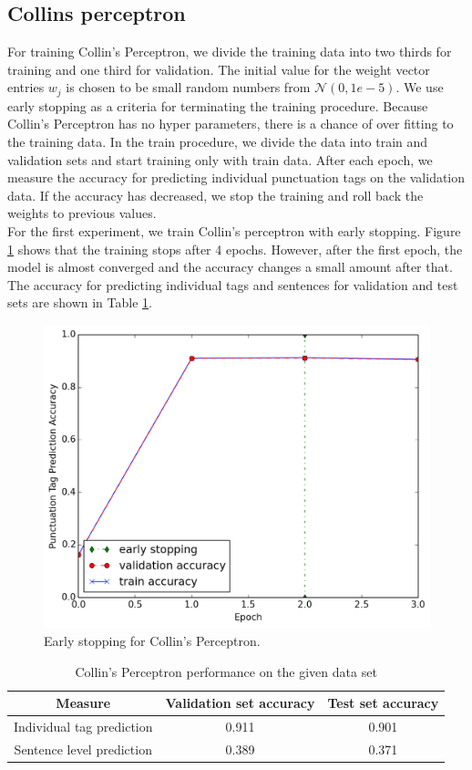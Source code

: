 \documentclass[twoside,12pt]{article}
\begin{document}
\subsection{Collins perceptron}
For training Collin's Perceptron, we divide the training data into two thirds for training and one third for validation. The initial value for the weight vector entries $w_j$ is chosen to be small random numbers from $\mathcal{N}(0,1e-5)$. We use early stopping as a criteria for terminating the training procedure. Because Collin's Perceptron has no hyper parameters, there is a chance of over fitting to the training data. In the train procedure, we divide the data into train and validation sets and start training only with train data. After each epoch, we measure the accuracy for predicting individual punctuation tags on the validation data. If the accuracy has decreased, we stop the training and roll back the weights to previous values.\\
For the first experiment, we train Collin's perceptron with early stopping. Figure \ref{figEarlyStoppingPercGibbs} shows that the training stops after 4 epochs. However, after the first epoch, the model is almost converged and the accuracy changes a small amount after that. The accuracy for predicting individual tags and sentences for validation and test sets are shown in Table \ref{tablePredPerceptron}.\\

\begin{figure}[H]
\centering
\includegraphics[width=.7\textwidth]{./figs/Perceptron/Perceptron.png}
\caption{Early stopping for Collin's Perceptron. }
\label{figEarlyStoppingPercGibbs}
\end{figure}

\begin{table}[H]\footnotesize
  \caption{Collin's Perceptron performance on the given data set}
\begin{center}
    \begin{tabular}{| c | c | c | }
    \hline
    \textbf{ Measure} & \textbf{Validation set accuracy} & \textbf{Test set accuracy} \\ \hline
    Individual tag prediction & 0.911 & 0.901  \\ \hline
    Sentence level prediction & 0.389 & 0.371  \\ \hline
    \end{tabular}
    \label{tablePredPerceptron}
\end{center}
\end{table}
\end{document}

